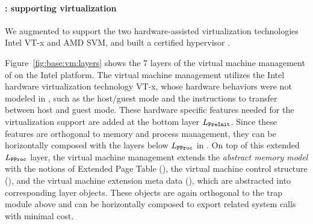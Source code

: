 

\paragraph{\mCTOShyper{}: supporting virtualization}
We augmented \mCTOSbase{} to support the two hardware-assisted
virtualization technologies Intel VT-x and AMD SVM, and built a
certified hypervisor \mCTOShyper{}.

Figure~\ref{fig:base:vm:layers} shows the 7 layers of the virtual
machine management of \mCTOShyper{} on the Intel platform.
The virtual machine management utilizes the Intel hardware
virtualization technology VT-x,
whose hardware behaviors were not modeled in \mCTOSbase{}, 
such as the host/guest mode and the instructions to transfer between
host and guest mode.
These hardware specific  features needed
for the virtualization support are added at the bottom layer $L_{\texttt{PreInit}}$.
Since these features are orthogonal to memory and process management,
they can be horizontally composed with the layers 
below $L_{\texttt{PProc}}$ in \mCTOSbase{}.
On top of this extended $L_{\texttt{PProc}}$ layer,
the virtual machine management extends the \emph{abstract memory model}
with the notions of Extended Page Table (), the virtual machine
control structure (), and the virtual machine extension meta data (),
which are abstracted into corresponding layer objects.
These objects are again orthogonal to the trap module above and can be
horizontally composed to export related system calls
with minimal cost.
 
